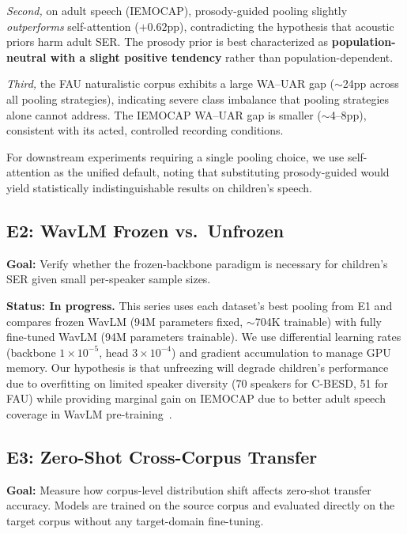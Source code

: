 \documentclass[11pt,a4paper]{article}
\begin{document}
\textit{Second,} on adult speech (IEMOCAP), prosody-guided pooling slightly
\textit{outperforms} self-attention ($+0.62$pp), contradicting the hypothesis
that acoustic priors harm adult SER. The prosody prior is best characterized as
\textbf{population-neutral with a slight positive tendency} rather than
population-dependent.

\textit{Third,} the FAU naturalistic corpus exhibits a large WA--UAR gap
($\sim$24pp across all pooling strategies), indicating severe class imbalance
that pooling strategies alone cannot address. The IEMOCAP WA--UAR gap is
smaller ($\sim$4--8pp), consistent with its acted, controlled recording
conditions.

For downstream experiments requiring a single pooling choice, we use
self-attention as the unified default, noting that substituting prosody-guided
would yield statistically indistinguishable results on children's speech.

\subsection{E2: WavLM Frozen vs.\ Unfrozen}
\label{ssec:e2}

\textbf{Goal:} Verify whether the frozen-backbone paradigm is necessary for
children's SER given small per-speaker sample sizes.

\textbf{Status: In progress.} This series uses each dataset's best pooling from
E1 and compares frozen WavLM (94M parameters fixed, $\sim$704K trainable) with
fully fine-tuned WavLM (94M parameters trainable). We use differential learning
rates (backbone $1\times10^{-5}$, head $3\times10^{-4}$) and gradient
accumulation to manage GPU memory. Our hypothesis is that unfreezing will
degrade children's performance due to overfitting on limited speaker diversity
(70 speakers for C-BESD, 51 for FAU) while providing marginal gain on IEMOCAP
due to better adult speech coverage in WavLM pre-training~\cite{chen2022wavlm}.

\subsection{E3: Zero-Shot Cross-Corpus Transfer}
\label{ssec:e3}

\textbf{Goal:} Measure how corpus-level distribution shift affects zero-shot
transfer accuracy. Models are trained on the source corpus and evaluated
directly on the target corpus without any target-domain fine-tuning.
\end{document}
